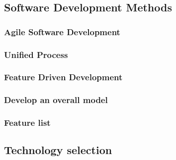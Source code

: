 \documentclass{article}
\begin{document}
    \subsection{Software Development Methods}

        \subsubsection{Agile Software Development}
        

        \subsubsection{Unified Process}
        

        \subsubsection{Feature Driven Development}
        

        \subsubsection{Develop an overall model}
        
        
        \subsubsection{Feature list}
        

    \subsection{Technology selection}
    
\end{document}
